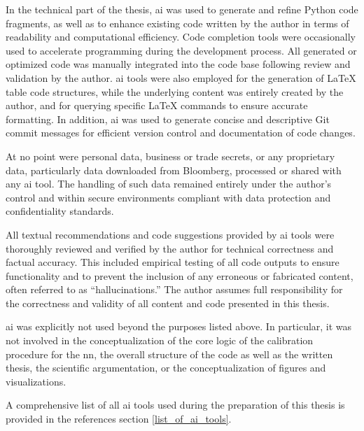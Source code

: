 In the technical part of the thesis, \ac{ai} was used to generate and refine Python code fragments, as well as to enhance existing code written by the author in terms of readability and computational efficiency. Code completion tools were occasionally used to accelerate programming during the development process. All generated or optimized code was manually integrated into the code base following review and validation by the author. \ac{ai} tools were also employed for the generation of LaTeX table code structures, while the underlying content was entirely created by the author, and for querying specific LaTeX commands to ensure accurate formatting. In addition, \ac{ai} was used to generate concise and descriptive Git commit messages for efficient version control and documentation of code changes.

At no point were personal data, business or trade secrets, or any proprietary data, particularly data downloaded from Bloomberg, processed or shared with any \ac{ai} tool. The handling of such data remained entirely under the author's control and within secure environments compliant with data protection and confidentiality standards.

All textual recommendations and code suggestions provided by \ac{ai} tools were thoroughly reviewed and verified by the author for technical correctness and factual accuracy. This included empirical testing of all code outputs to ensure functionality and to prevent the inclusion of any erroneous or fabricated content, often referred to as “hallucinations.” The author assumes full responsibility for the correctness and validity of all content and code presented in this thesis.

\ac{ai} was explicitly not used beyond the purposes listed above. In particular, it was not involved in the conceptualization of the core logic of the calibration procedure for the \ac{nn}, the overall structure of the code as well as the written thesis, the scientific argumentation, or the conceptualization of figures and visualizations.

A comprehensive list of all \ac{ai} tools used during the preparation of this thesis is provided in the references section \ref{list_of_ai_tools}.